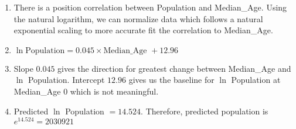 \documentclass[12pt, a4paper]{article}
\begin{document}
\begin{enumerate}[Q\arabic*.]
\begin{enumerate}[(\alph*.)]
    \item There is a position correlation between Population and Median\_Age. Using the natural logarithm, we can normalize data which follows a natural exponential scaling to more accurate fit the correlation to Median\_Age.
      \begin{minipage}[t]{.4\textwidth}
      \end{minipage}%
      \begin{minipage}[t]{.4\textwidth}
      \end{minipage}%

    \item $\ln \text{Population} = 0.045 \times \text{Median\_Age } + 12.96$

    \item Slope $0.045$ gives the direction for greatest change between Median\_Age and $\ln$ Population. Intercept $12.96$ gives us the baseline for $\ln$ Population at Median\_Age 0 which is not meaningful.

    \item Predicted $\ln$ Population $= 14.524$. Therefore, predicted population is $e^{14.524} = 2030921$
    \end{enumerate}

\end{enumerate}
\end{document}
